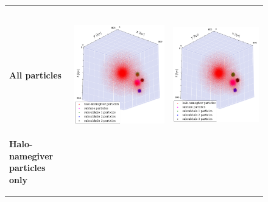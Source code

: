 \begin{subfigures}
\begin{figure}[!htbp]
{		}
	\end{figure}
	\begin{figure}[!htbp]%
		{
			\renewcommand{\arraystretch}{0.1}
			\centering	
			\begin{tabular}{|p{.5cm} c c|}
				\hline
				&&\\[1em]
				&	\neigh\ 	& \iter \\[1.5em]
				\begin{sideways}{\hspace{3cm} \textbf{All particles}}\end{sideways} \hspace*{-1em}	&		 
				{\includegraphics[width = .42\textwidth]{images/dice-sub/dice-sub-plot-halo1-saddle.png}} \hspace*{-1em} 	& 
				{\includegraphics[width = .42\textwidth]{images/dice-sub/dice-sub-plot-halo1-iter.png}} \hspace*{-1em}	\\
				\begin{sideways}{ \hspace{.5cm}\textbf{Halo-namegiver particles only} }\end{sideways}	 \hspace*{-1em}			 &			 

\end{tabular}}
\end{figure}
\end{subfigures}
